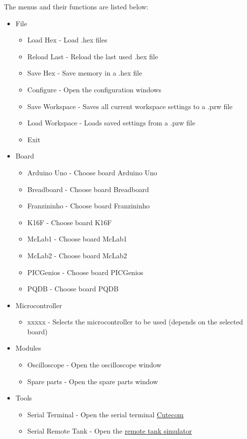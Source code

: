 The menus and their functions are listed below:
\begin{itemize}
\item File
\begin{itemize}
\item Load Hex - Load .hex files
\item Reload Last - Reload the last used .hex file
\item Save Hex - Save memory in a .hex file
\item Configure - Open the configuration windows
\item Save Workspace - Saves all current workspace settings to a .pzw file
\item Load Workspace - Loads saved settings from a .pzw file
\item Exit
\end{itemize}
\item Board
\begin{itemize}
\item Arduino Uno - Choose board Arduino Uno
\item Breadboard - Choose board Breadboard
\item Franzininho - Choose board Franzininho
\item K16F - Choose board K16F
\item McLab1 - Choose board McLab1
\item McLab2 - Choose board McLab2
\item PICGenios - Choose board PICGenios
\item PQDB - Choose board PQDB
\end{itemize}
\item Microcontroller
\begin{itemize}
 \item xxxxx - Selects the microcontroller to be used (depends on the selected board)
\end{itemize}
\item Modules
\begin{itemize}
\item Oscilloscope - Open the oscilloscope window
\item Spare parts - Open the spare parts window
\end{itemize}
\item Tools 
\begin{itemize}
 \item Serial Terminal - Open the serial terminal \hyperlink{def:sterm}{Cutecom}
 \item Serial Remote Tank - Open the \hyperlink{def:srtank}{remote tank simulator}

\end{itemize}
\end{itemize}
